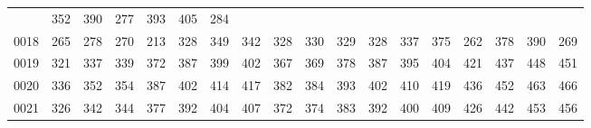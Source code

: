 \begin{table}[htbp]
\begin{center}
{\begin{tabular}{lccccccccccccccccc}
					       & 352 & 390 & 277 & 393 &
								   405 &
								       284 \\
0018 & 265 & 278 & 270 & 213 & 328 & 349 & 342 & 328 & 330 & 329 & 328
					       & 337 & 375 & 262 & 378 &
								   390 &
								       269 \\
0019 & 321 & 337 & 339 & 372 & 387 & 399 & 402 & 367 & 369 & 378 & 387
					       & 395 & 404 & 421 & 437 &
								   448 &
								       451 \\
0020 & 336 & 352 & 354 & 387 & 402 & 414 & 417 & 382 & 384 & 393 & 402
					       & 410 & 419 & 436 & 452 &
								   463 &
								       466 \\
0021 & 326 & 342 & 344 & 377 & 392 & 404 & 407 & 372 & 374 & 383 & 392
					       & 400 & 409 & 426 & 442 &
								   453 &
								       456 \\
\hline
%
  \end{tabular}
  }
 \end{center}
\end{table}

\newpage

